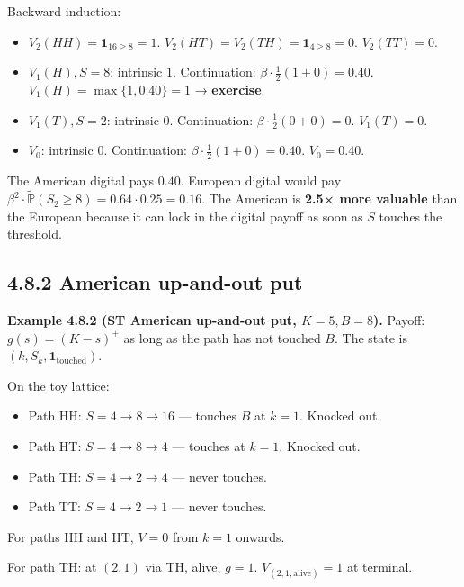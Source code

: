 \documentclass[
  10pt,
  twoside]{book}
\providecommand{\tightlist}{%
  \setlength{\itemsep}{0pt}\setlength{\parskip}{0pt}}
\begin{document}
Backward induction:

\begin{itemize}
\tightlist
\item
  \(V_2(HH) = \mathbf{1}_{16 \ge 8} = 1\).
  \(V_2(HT) = V_2(TH) = \mathbf{1}_{4\ge 8} = 0\). \(V_2(TT) = 0\).
\item
  \(V_1(H), S = 8\): intrinsic \(1\). Continuation:
  \(\beta\cdot\tfrac{1}{2}(1 + 0) = 0.40\).
  \(V_1(H) = \max\{1, 0.40\} = 1\) → \textbf{exercise}.
\item
  \(V_1(T), S = 2\): intrinsic \(0\). Continuation:
  \(\beta\cdot\tfrac{1}{2}(0 + 0) = 0\). \(V_1(T) = 0\).
\item
  \(V_0\): intrinsic \(0\). Continuation:
  \(\beta\cdot\tfrac{1}{2}(1 + 0) = 0.40\). \(V_0 = 0.40\).
\end{itemize}

The American digital pays \(0.40\). European digital would pay
\(\beta^2\cdot\tilde{\mathbb{P}}(S_2 \ge 8) = 0.64\cdot 0.25 = 0.16\).
The American is \textbf{2.5× more valuable} than the European because it
can lock in the digital payoff as soon as \(S\) touches the threshold.

\subsection{4.8.2 American up-and-out
put}\label{american-up-and-out-put}

\textbf{Example 4.8.2 (ST American up-and-out put, \(K = 5, B = 8\)).}
Payoff: \(g(s) = (K - s)^+\) as long as the path has not touched \(B\).
The state is \((k, S_k, \mathbf{1}_{\text{touched}})\).

On the toy lattice:

\begin{itemize}
\tightlist
\item
  Path HH: \(S = 4 \to 8 \to 16\) --- touches \(B\) at \(k = 1\).
  Knocked out.
\item
  Path HT: \(S = 4 \to 8 \to 4\) --- touches at \(k = 1\). Knocked out.
\item
  Path TH: \(S = 4 \to 2 \to 4\) --- never touches.
\item
  Path TT: \(S = 4 \to 2 \to 1\) --- never touches.
\end{itemize}

For paths HH and HT, \(V = 0\) from \(k=1\) onwards.

For path TH: at \((2, 1)\) via TH, alive, \(g = 1\).
\(V_{(2,1, \text{alive})} = 1\) at terminal.
\end{document}
